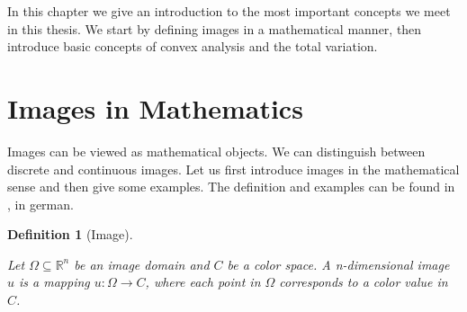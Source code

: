 \documentclass{scrreprt}
\newtheorem{definition}[theorem]{Definition}
\begin{document}
    In this chapter we give an introduction to the most important concepts we meet in this thesis. We start by defining images in a mathematical manner, then introduce basic concepts of convex analysis and the total variation.
    \section{Images in Mathematics} %
    \label{sec:images_in_mathematics}

        Images can be viewed as mathematical objects. We can distinguish between discrete and continuous images. Let us first introduce images in the mathematical sense and then give some examples. The definition and examples can be found in \cite{Bredies}, in german.

        \begin{definition}[Image] %
        \label{def:image}

            Let $\Omega \subseteq \mathbb{R}^{n}$ be an image domain and $C$ be a color space. A n-dimensional image $u$ is a mapping $u: \Omega \longrightarrow C$, where each point in $\Omega$ corresponds to a color value in $C$.

        \end{definition}
\end{document}
